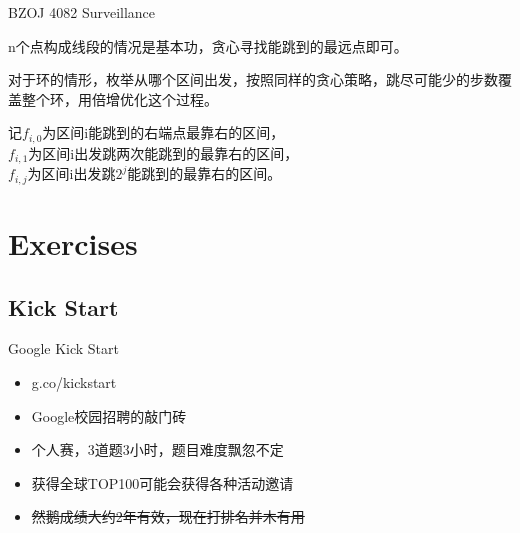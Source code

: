 \documentclass{beamer}
\begin{document}
\begin{frame}{BZOJ 4082 Surveillance}
    
    n个点构成线段的情况是基本功，贪心寻找能跳到的最远点即可。

    对于环的情形，枚举从哪个区间出发，按照同样的贪心策略，跳尽可能少的步数覆盖整个环，用倍增优化这个过程。

    记$f_{i,0}$为区间i能跳到的右端点最靠右的区间， \\
    $f_{i,1}$为区间i出发跳两次能跳到的最靠右的区间， \\
    $f_{i,j}$为区间i出发跳$2^j$能跳到的最靠右的区间。

\end{frame}

\section{Exercises}

\subsection{Kick Start}

\begin{frame}{Google Kick Start}

    \begin{itemize}
        \item g.co/kickstart
        \item Google校园招聘的敲门砖
        \item 个人赛，3道题3小时，题目难度飘忽不定
        \item 获得全球TOP100可能会获得各种活动邀请
        \item \sout{然鹅成绩大约2年有效，现在打排名并木有用}
    \end{itemize}
    
\end{frame}
\end{document}
